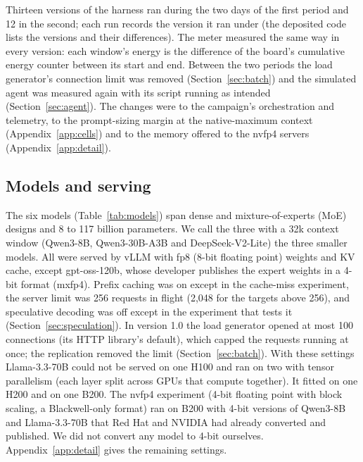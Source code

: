 \documentclass[11pt]{article}
\begin{document}
Thirteen versions of the harness ran during the two days of the first period and 12 in the second; each run records the version it ran under (the deposited code lists the versions and their differences). The meter measured the same way in every version: each window's energy is the difference of the board's cumulative energy counter between its start and end. Between the two periods the load generator's connection limit was removed (Section~\ref{sec:batch}) and the simulated agent was measured again with its script running as intended (Section~\ref{sec:agent}). The changes were to the campaign's orchestration and telemetry, to the prompt-sizing margin at the native-maximum context (Appendix~\ref{app:cells}) and to the memory offered to the nvfp4 servers (Appendix~\ref{app:detail}).

\subsection{Models and serving}\label{sec:models}

The six models (Table~\ref{tab:models}) span dense and mixture-of-experts (MoE) designs and 8 to 117 billion parameters. We call the three with a 32k context window (Qwen3-8B, Qwen3-30B-A3B and DeepSeek-V2-Lite) the three smaller models. All were served by vLLM with fp8 (8-bit floating point) weights and KV cache, except gpt-oss-120b, whose developer publishes the expert weights in a 4-bit format (mxfp4). Prefix caching was on except in the cache-miss experiment, the server limit was 256 requests in flight (2,048 for the targets above 256), and speculative decoding was off except in the experiment that tests it (Section~\ref{sec:speculation}). In version 1.0 the load generator opened at most 100 connections (its HTTP library's default), which capped the requests running at once; the replication removed the limit (Section~\ref{sec:batch}). With these settings Llama-3.3-70B could not be served on one H100 and ran on two with tensor parallelism (each layer split across GPUs that compute together). It fitted on one H200 and on one B200. The nvfp4 experiment (4-bit floating point with block scaling, a Blackwell-only format) ran on B200 with 4-bit versions of Qwen3-8B and Llama-3.3-70B that Red Hat and NVIDIA had already converted and published. We did not convert any model to 4-bit ourselves. Appendix~\ref{app:detail} gives the remaining settings.
\end{document}
